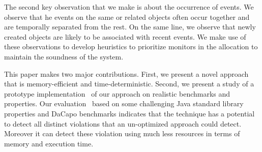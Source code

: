 The second key observation that we make is about the occurrence of events.
We observe that he events on the same or related objects often occur together
and are temporally separated from the rest. On the same line, we observe
that newly created objects are likely to be associated with recent events.
We make use of these observations to develop heuristics to prioritize monitors
in the allocation to maintain the soundness of the system.


This paper makes two major contributions.
First, we present a novel approach~ that is memory-efficient 
and time-deterministic. Second, we present a study of a prototype 
implementation~ of our approach on realistic 
benchmarks and properties. Our evaluation~ based on some
challenging Java standard library properties and DaCapo benchmarks 
indicates that the technique has a potential to detect all distinct violations that an 
un-optimized approach could detect. Moreover it can detect these violation using
much less resources in terms of memory and execution time.



